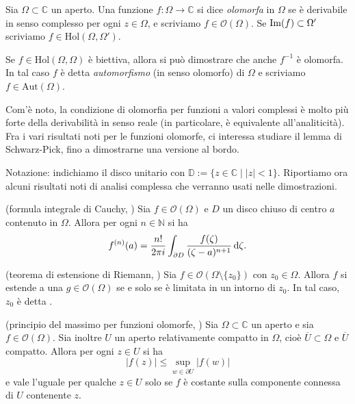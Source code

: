 \begin{defn}
  Sia $\Omega \subset \mathbb{C}$ un aperto. Una funzione $f:\Omega \longrightarrow \mathbb{C}$ si dice \textit{olomorfa} in $\Omega$ se è derivabile in senso complesso per ogni $z \in \Omega$, e scriviamo $f \in \mathcal{O}(\Omega)$. Se $\operatorname{Im}(f) \subset \Omega'$ scriviamo $f \in \text{Hol}(\Omega, \Omega')$.
\end{defn}

\begin{defn}
  Se $f \in \text{Hol}(\Omega, \Omega)$ è biettiva, allora si può dimostrare che anche $f^{-1}$ è olomorfa. In tal caso $f$ è detta \textit{automorfismo} (in senso olomorfo) di $\Omega$ e scriviamo $f \in \text{Aut}(\Omega)$.
\end{defn}

Com'è noto, la condizione di olomorfia per funzioni a valori complessi è molto più forte della derivabilità in senso reale (in particolare, è equivalente all'analiticità). Fra i vari risultati noti per le funzioni olomorfe, ci interessa studiare il lemma di Schwarz-Pick, fino a dimostrarne una versione al bordo.

Notazione: indichiamo il disco unitario con $\mathbb{D}:=\{z \in \mathbb{C} \mid |z|<1\}$. Riportiamo ora alcuni risultati noti di analisi complessa che verranno usati nelle dimostrazioni.

\begin{thm}
  (formula integrale di Cauchy, \cite[Chapter 1.3, Theorems 9 and 10]{NN}) Sia $f \in \mathcal{O}(\Omega)$ e $D$ un disco chiuso di centro $a$ contenuto in $\Omega$. Allora per ogni $n \in \mathbb{N}$ si ha
  \begin{equation}
    f^{(n)}(a)=\frac{n!}{2\pi i} \int_{\partial D} \frac{f(\zeta)}{(\zeta-a)^{n+1}}\mathop{}\!\mathrm{d}\zeta.
  \end{equation}
\end{thm}

\begin{prop} \label{estensione}
  (teorema di estensione di Riemann, \cite[Chapter 1.5, Theorem 2]{NN}) Sia $f \in \mathcal{O}(\Omega \setminus\{z_0\})$ con $z_0 \in \Omega$. Allora $f$ si estende a una $g \in \mathcal{O}(\Omega)$ se e solo se è limitata in un intorno di $z_0$. In tal caso, $z_0$ è detta .
\end{prop}

\begin{prop}
  (principio del massimo per funzioni olomorfe, \cite[Chapter 1.3, Corollary of Theorem 3 and Theorem 5]{NN}) Sia $\Omega \subset \mathbb{C}$ un aperto e sia $f \in \mathcal{O}(\Omega)$. Sia inoltre $U$ un aperto relativamente compatto in $\Omega$, cioè $\overline{U} \subset \Omega$ e $\overline{U}$ compatto. Allora per ogni $z \in U$ si ha
  $$|f(z)| \le \sup_{w \in \partial U} |f(w)|$$
  e vale l'uguale per qualche $z \in U$ solo se $f$ è costante sulla componente connessa di $U$ contenente $z$.
\end{prop}

